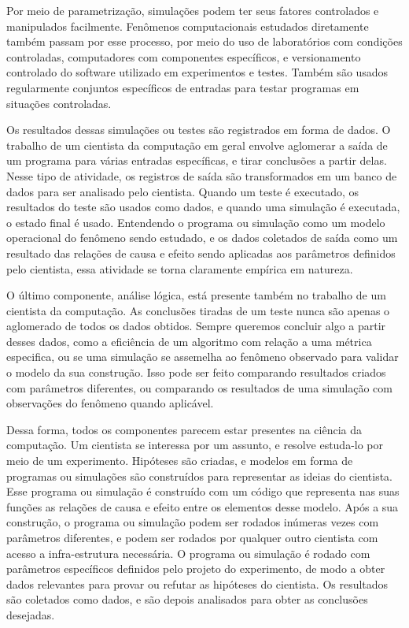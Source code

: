 Por meio de parametrização, simulações podem ter seus fatores controlados e manipulados facilmente. Fenômenos computacionais estudados diretamente também passam por esse processo, por meio do uso de laboratórios com condições controladas, computadores com componentes específicos, e versionamento controlado do software utilizado em experimentos e testes. Também são usados regularmente conjuntos específicos de entradas para testar programas em situações controladas.

Os resultados dessas simulações ou testes são registrados em forma de dados. O trabalho de um cientista da computação em geral envolve aglomerar a saída de um programa para várias entradas específicas, e tirar conclusões a partir delas. Nesse tipo de atividade, os registros de saída são transformados em um banco de dados para ser analisado pelo cientista. Quando um teste é executado, os resultados do teste são usados como dados, e quando uma simulação é executada, o estado final é usado. Entendendo o programa ou simulação como um modelo operacional do fenômeno sendo estudado, e os dados coletados de saída como um resultado das relações de causa e efeito sendo aplicadas aos parâmetros definidos pelo cientista, essa atividade se torna claramente empírica em natureza.

O último componente, análise lógica, está presente também no trabalho de um cientista da computação. As conclusões tiradas de um teste nunca são apenas o aglomerado de todos os dados obtidos. Sempre queremos concluir algo a partir desses dados, como a eficiência de um algoritmo com relação a uma métrica especifica, ou se uma simulação se assemelha ao fenômeno observado para validar o modelo da sua construção. Isso pode ser feito comparando resultados criados com parâmetros diferentes, ou comparando os resultados de uma simulação com observações do fenômeno quando aplicável.

Dessa forma, todos os componentes parecem estar presentes na ciência da computação. Um cientista se interessa por um assunto, e resolve estuda-lo por meio de um experimento. Hipóteses são criadas, e modelos em forma de programas ou simulações são construídos para representar as ideias do cientista. Esse programa ou simulação é construído com um código que representa nas suas funções as relações de causa e efeito entre os elementos desse modelo. Após a sua construção, o programa ou simulação podem ser rodados inúmeras vezes com parâmetros diferentes, e podem ser rodados por qualquer outro cientista com acesso a infra-estrutura necessária. O programa ou simulação é rodado com parâmetros específicos definidos pelo projeto do experimento, de modo a obter dados relevantes para provar ou refutar as hipóteses do cientista. Os resultados são coletados como dados, e são depois analisados para obter as conclusões desejadas.